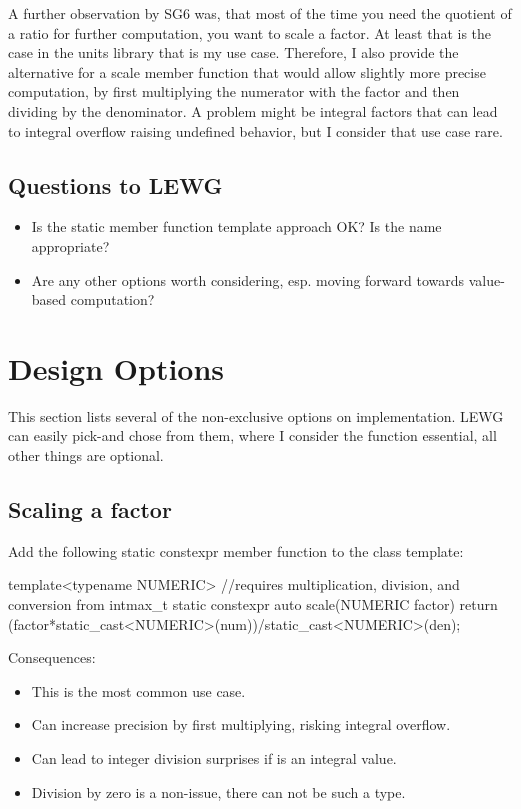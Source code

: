 \documentclass[ebook,11pt,article]{memoir}
\begin{document}
A further observation by SG6 was, that most of the time you need the quotient of a ratio for further computation, you want to scale a factor. At least that is the case in the units library that is my use case. Therefore, I also provide the alternative for a scale member function that would allow slightly more precise computation, by first multiplying the numerator with the factor and then dividing by the denominator. A problem might be integral factors that can lead to integral overflow raising undefined behavior, but I consider that use case rare.

\section{Questions to LEWG}
\begin{itemize}
\item Is the  static member function template approach OK? Is the name appropriate?
\item Are any other options worth considering, esp. moving forward towards value-based computation?
\end{itemize}


\chapter{Design Options}

This section lists several of the non-exclusive options on implementation. LEWG can easily pick-and chose from them, where I consider the  function essential, all other things are optional.

\section{Scaling a factor}
Add the following static constexpr member function to the  class template:
\begin{codeblock}
      template<typename NUMERIC> //requires multiplication, division, and conversion from intmax_t
      static constexpr
	  auto scale(NUMERIC factor) {
          return (factor*static_cast<NUMERIC>(num))/static_cast<NUMERIC>(den);
      }
\end{codeblock}

Consequences: 
\begin{itemize}
\item This is the most common use case.
\item Can increase precision by first multiplying, risking integral overflow.
\item Can lead to integer division surprises if  is an integral value.
\item Division by zero is a non-issue, there can not be such a  type.
\end{itemize}
\end{document}
